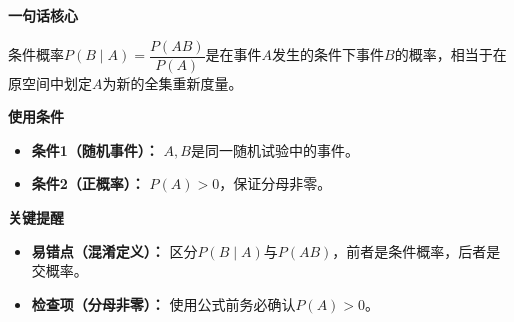 \begin{summarybox}
	\textbf{\textcolor{CSummary}{一句话核心}}

	条件概率$P(B \mid A)=\dfrac{P(AB)}{P(A)}$是在事件$A$发生的条件下事件$B$的概率，相当于在原空间中划定$A$为新的全集重新度量。

	\medskip
	\textbf{\textcolor{CSummary}{使用条件}}
	\begin{itemize}[leftmargin=*, itemsep=0.5em, topsep=0.4em]
		\item \textbf{条件1（随机事件）：} $A,B$是同一随机试验中的事件。
		\item \textbf{条件2（正概率）：} $P(A)>0$，保证分母非零。
	\end{itemize}

	\medskip
	\textbf{\textcolor{CSummary}{关键提醒}}
	\begin{itemize}[leftmargin=*, itemsep=0.5em, topsep=0.4em]
		\item \textbf{易错点（混淆定义）：} 区分$P(B \mid A)$与$P(AB)$，前者是条件概率，后者是交概率。
		\item \textbf{检查项（分母非零）：} 使用公式前务必确认$P(A)>0$。
	\end{itemize}
\end{summarybox}
